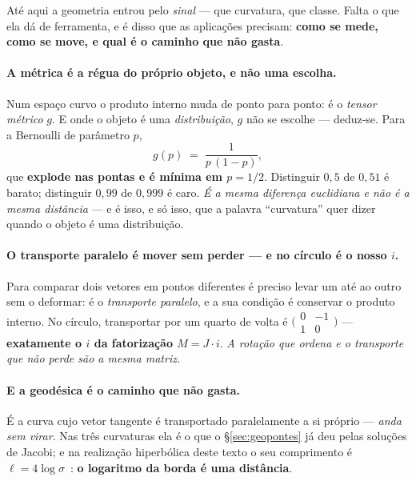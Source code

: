 \documentclass[livro.tex]{subfiles}
\begin{document}
Até aqui a geometria entrou pelo \emph{sinal} --- que curvatura, que classe. Falta o que ela dá de
ferramenta, e é disso que as aplicações precisam: \textbf{como se mede, como se move, e qual é o
caminho que não gasta}.

\paragraph{A métrica é a régua do próprio objeto, e não uma escolha.} Num espaço curvo o produto
interno muda de ponto para ponto: é o \emph{tensor métrico} $g$. E onde o objeto é uma
\emph{distribuição}, $g$ não se escolhe --- deduz-se. Para a Bernoulli de parâmetro $p$,
\[
  g(p) \;=\; \frac{1}{p\,(1-p)} ,
\]
que \textbf{explode nas pontas e é mínima em $p=1/2$}. Distinguir $0{,}5$ de $0{,}51$ é barato;
distinguir $0{,}99$ de $0{,}999$ é caro. \emph{É a mesma diferença euclidiana e não é a mesma
distância} --- e é isso, e só isso, que a palavra ``curvatura'' quer dizer quando o objeto é uma
distribuição.


\paragraph{O transporte paralelo é mover sem perder --- e no círculo é o nosso $i$.} Para comparar
dois vetores em pontos diferentes é preciso levar um até ao outro sem o deformar: é o
\emph{transporte paralelo}, e a sua condição é conservar o produto interno. No círculo, transportar
por um quarto de volta é
$\bigl(\begin{smallmatrix}0&-1\\1&0\end{smallmatrix}\bigr)$ --- \textbf{exatamente o $i$ da
fatorização $M=J\cdot i$}. \emph{A rotação que ordena e o transporte que não perde são a mesma
matriz.}


\paragraph{E a geodésica é o caminho que não gasta.} É a curva cujo vetor tangente é transportado
paralelamente a si próprio --- \emph{anda sem virar}. Nas três curvaturas ela é o que o
\S\ref{sec:geopontes} já deu pelas soluções de Jacobi; e na realização hiperbólica deste texto o seu
comprimento é $\ell=4\log\sigma$~\cite{series1985}: \textbf{o logaritmo da borda é uma distância}.
\end{document}
